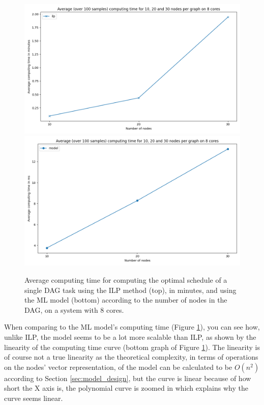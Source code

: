 \begin{figure}
    \centering
    \includegraphics[width=\linewidth]{images/result_computing_time_ilp_m8.png}
    \includegraphics[width=\linewidth]{images/result_computing_time_model_m8.png}
    \caption{Average computing time for computing the optimal schedule
    of a single DAG task using the ILP method (top), in minutes,
    and using the ML model (bottom) according to 
    the number of nodes in the DAG, on a system with 8 cores.}
    \label{fig:compute_time_ilp_model}
\end{figure}

When comparing to the ML model's computing time (Figure \ref{fig:compute_time_ilp_model}),
you can see how, unlike ILP, the model seems to be a lot more scalable
than ILP, as shown by the linearity of the computing time curve (bottom graph of Figure \ref{fig:compute_time_ilp_model}).
The linearity is of course not a true linearity as the theoretical complexity,
in terms of operations on the nodes' vector representation,
of the model can be calculated to be $O(n^2)$ according to Section \ref{sec:model_design},
but the curve is linear because of how short the X axis is,
the polynomial curve is zoomed in which explains why the curve seems linear.

